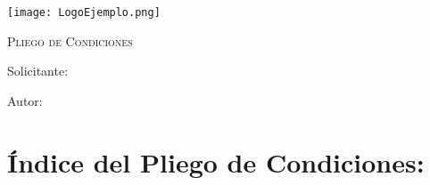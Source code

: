\documentclass[main]{subfiles}
\begin{document}
\newpage
\thispagestyle{empty}
\begin{center}
    \centering
    \texttt{[image: LogoEjemplo.png]} \par
    \vspace{3 cm}
    {\scshape\Huge Pliego de Condiciones \par}
    \vspace{1.5cm}
    {\itshape\Huge \TituloProyecto \par}
    \vfill
    {\Large Solicitante:  \Solicitante \par}
    \vspace{0.5cm}
    {\Large Autor:  \Autor \par}
    \vspace{1.5cm}
    {\Large \Fecha \par}
\end{center}


\chapter*{Índice del Pliego de Condiciones:}


\end{document}
